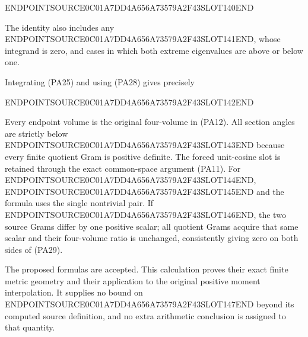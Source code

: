ENDPOINTSOURCE0C01A7DD4A656A73579A2F43SLOT140END

The identity also includes any ENDPOINTSOURCE0C01A7DD4A656A73579A2F43SLOT141END, whose integrand is zero, and cases in which both extreme eigenvalues are above or below one.

Integrating (PA25) and using (PA28) gives precisely

ENDPOINTSOURCE0C01A7DD4A656A73579A2F43SLOT142END

Every endpoint volume is the original four-volume in (PA12). All section angles are strictly below ENDPOINTSOURCE0C01A7DD4A656A73579A2F43SLOT143END because every finite quotient Gram is positive definite. The forced unit-cosine slot is retained through the exact common-space argument (PA11). For ENDPOINTSOURCE0C01A7DD4A656A73579A2F43SLOT144END, ENDPOINTSOURCE0C01A7DD4A656A73579A2F43SLOT145END and the formula uses the single nontrivial pair. If ENDPOINTSOURCE0C01A7DD4A656A73579A2F43SLOT146END, the two source Grams differ by one positive scalar; all quotient Grams acquire that same scalar and their four-volume ratio is unchanged, consistently giving zero on both sides of (PA29).

The proposed formulas are accepted. This calculation proves their exact finite metric geometry and their application to the original positive moment interpolation. It supplies no bound on ENDPOINTSOURCE0C01A7DD4A656A73579A2F43SLOT147END beyond its computed source definition, and no extra arithmetic conclusion is assigned to that quantity.
